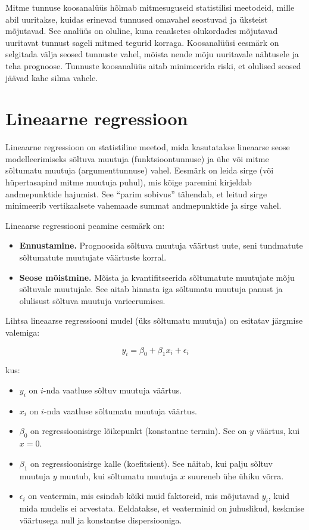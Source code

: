 \documentclass[
]{book}
\providecommand{\tightlist}{%
  \setlength{\itemsep}{0pt}\setlength{\parskip}{0pt}}
\begin{document}
Mitme tunnuse koosanalüüs hõlmab mitmesuguseid statistilisi meetodeid, mille abil uuritakse, kuidas erinevad tunnused omavahel seostuvad ja üksteist mõjutavad. See analüüs on oluline, kuna reaalsetes olukordades mõjutavad uuritavat tunnust sageli mitmed tegurid korraga. Koosanalüüsi eesmärk on selgitada välja seosed tunnuste vahel, mõista nende mõju uuritavale nähtusele ja teha prognoose. Tunnuste koosanalüüs aitab minimeerida riski, et olulised seosed jäävad kahe silma vahele.

\section{Lineaarne regressioon}\label{lineaarne-regressioon}

Lineaarne regressioon on statistiline meetod, mida kasutatakse lineaarse seose modelleerimiseks sõltuva muutuja (funktsioontunnuse) ja ühe või mitme sõltumatu muutuja (argumenttunnuse) vahel. Eesmärk on leida sirge (või hüpertasapind mitme muutuja puhul), mis kõige paremini kirjeldab andmepunktide hajumist. See ``parim sobivus'' tähendab, et leitud sirge minimeerib vertikaalsete vahemaade summat andmepunktide ja sirge vahel.

Lineaarse regressiooni peamine eesmärk on:

\begin{itemize}
\tightlist
\item
  \textbf{Ennustamine.} Prognoosida sõltuva muutuja väärtust uute, seni tundmatute sõltumatute muutujate väärtuste korral.
\item
  \textbf{Seose mõistmine.} Mõista ja kvantifitseerida sõltumatute muutujate mõju sõltuvale muutujale. See aitab hinnata iga sõltumatu muutuja panust ja olulisust sõltuva muutuja varieerumises.
\end{itemize}

Lihtsa lineaarse regressiooni mudel (üks sõltumatu muutuja) on esitatav järgmise valemiga:

\[y_i = \beta_0 + \beta_1 x_i + \epsilon_i\]

kus:

\begin{itemize}
\tightlist
\item
  \(y_i\) on \(i\)-nda vaatluse sõltuv muutuja väärtus.
\item
  \(x_i\) on \(i\)-nda vaatluse sõltumatu muutuja väärtus.
\item
  \(\beta_0\) on regressioonisirge lõikepunkt (konstantne termin). See on \(y\) väärtus, kui \(x = 0\).
\item
  \(\beta_1\) on regressioonisirge kalle (koefitsient). See näitab, kui palju sõltuv muutuja \(y\) muutub, kui sõltumatu muutuja \(x\) suureneb ühe ühiku võrra.
\item
  \(\epsilon_i\) on veatermin, mis esindab kõiki muid faktoreid, mis mõjutavad \(y_i\), kuid mida mudelis ei arvestata. Eeldatakse, et veaterminid on juhuslikud, keskmise väärtusega null ja konstantse dispersiooniga.
\end{itemize}
\end{document}
